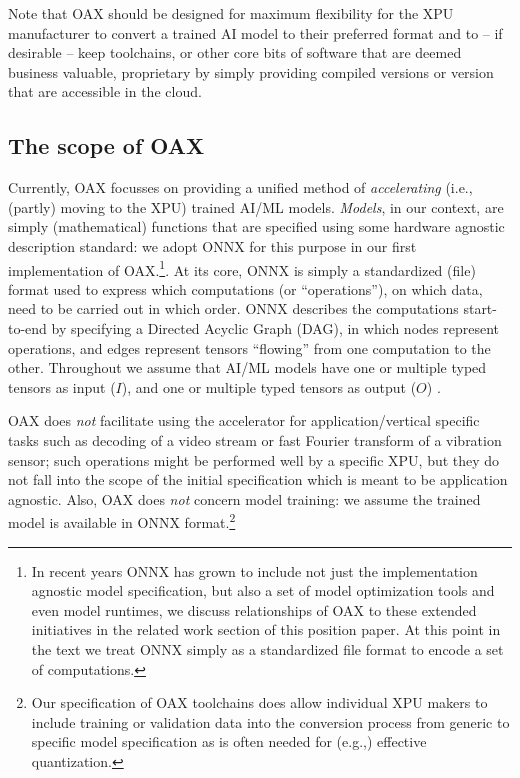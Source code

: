 \documentclass{article}
\begin{document}
Note that OAX should be designed for maximum flexibility for the XPU manufacturer to convert a trained AI model to their preferred format and to -- if desirable -- keep toolchains, or other core bits of software that are deemed business valuable, proprietary by simply providing compiled versions or version that are accessible in the cloud.

\subsection{The scope of OAX}

Currently, OAX focusses on providing a unified method of \emph{accelerating} (i.e., (partly) moving to the XPU) trained AI/ML models. \emph{Models}, in our context, are simply (mathematical) functions that are specified using some hardware agnostic description standard: we adopt ONNX \cite{ONNX} for this purpose in our first implementation of OAX.\footnote{In recent years ONNX has grown to include not just the implementation agnostic model specification, but also a set of model optimization tools and even model runtimes, we discuss relationships of OAX to these extended initiatives in the related work section of this position paper. At this point in the text we treat ONNX simply as a standardized file format to encode a set of computations.}. At its core, ONNX is simply a standardized (file) format used to express which computations (or ``operations''), on which data, need to be carried out in which order. ONNX describes the computations start-to-end by specifying a Directed Acyclic Graph (DAG), in which nodes represent operations, and edges represent tensors ``flowing'' from one computation to the other. Throughout we assume that AI/ML models have one or multiple typed tensors as input ($I$), and  one or multiple typed tensors as output ($O$) . 

OAX does \emph{not} facilitate using the accelerator for application/vertical specific tasks such as decoding of a video stream or fast Fourier transform of a vibration sensor; such operations might be performed well by a specific XPU, but they do not fall into the scope of the initial  specification which is meant to be application agnostic. Also, OAX does \emph{not} concern model training: we assume the trained model is available in ONNX format.\footnote{Our specification of OAX toolchains does allow individual XPU makers to include training or validation data into the conversion process from generic to specific model specification as is often needed for (e.g.,) effective quantization.}
\end{document}
